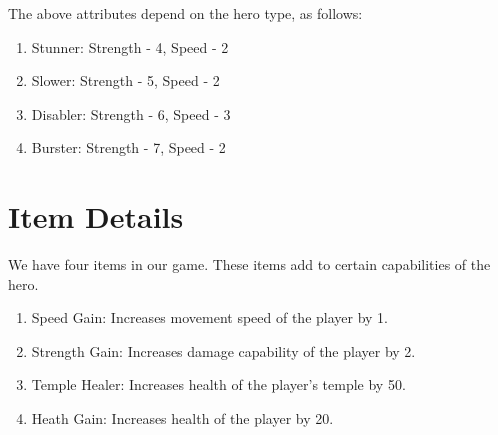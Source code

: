 The above attributes depend on the hero type, as follows:
\begin{enumerate}
\item Stunner: Strength - 4, Speed - 2
\item Slower: Strength - 5, Speed - 2
\item Disabler: Strength - 6, Speed - 3
\item Burster: Strength - 7, Speed - 2
\end{enumerate}



\section{Item Details}
We have four items in our game. These items add to certain capabilities of the hero.
\begin{enumerate}
\item Speed Gain: Increases movement speed of the player by 1.
\item Strength Gain: Increases damage capability of the player by 2.
\item Temple Healer: Increases health of the player’s temple by 50.
\item Heath Gain: Increases health of the player by 20.
\end{enumerate}

